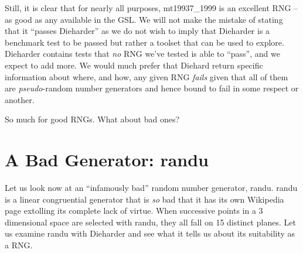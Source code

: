 \documentclass{book}
\begin{document}
Still, it is clear that for nearly all purposes, mt19937\_1999 is an
excellent RNG -- as good as any available in the GSL.  We will not make
the mistake of stating that it ``passes Dieharder'' as we do not wish to
imply that Dieharder is a benchmark test to be passed but rather a
toolset that can be used to explore.  Dieharder contains tests that {\em
no} RNG we've tested is able to ``pass'', and we expect to add more.  We
would much prefer that Diehard return specific information about where,
and how, any given RNG {\em fails} given that all of them are {\em
pseudo}-random number generators and hence bound to fail in some respect
or another.

So much for good RNGs.  What about bad ones?

\section{A Bad Generator: randu}

Let us look now at an ``infamously bad'' random number generator, randu.
randu is a linear congruential generator that is {\em so} bad that it
has its own Wikipedia page\cite{wiki_randu} extolling its complete lack
of virtue.  When successive points in a 3 dimensional space are selected
with randu, they all fall on 15 distinct planes.  Let us examine randu
with Dieharder and see what it tells us about its suitability as a RNG.
\end{document}
